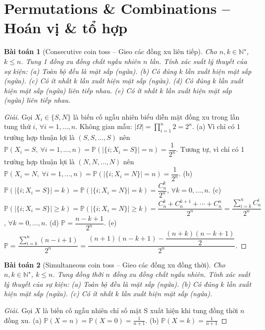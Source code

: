 \documentclass[oneside]{book}
\newtheorem{baitoan}{Bài toán}
\begin{document}

\section{Permutations \& Combinations -- Hoán vị \& tổ hợp}

\begin{baitoan}[Consecutive coin toss -- Gieo các đồng xu liên tiếp]
	Cho $n,k\in\mathbb{N}^\star$, $k\le n$. Tung 1 đồng xu đồng chất ngẫu nhiên $n$ lần. Tính xác suất lý thuyết của sự kiện: (a) Toàn bộ đều là mặt sấp (ngửa). (b) Có đúng $k$ lần xuất hiện mặt sấp (ngửa). (c) Có ít nhất $k$ lần xuất hiện mặt sấp (ngửa). (d) Có đúng $k$ lần xuất hiện mặt sấp (ngửa) liên tiếp nhau. (e) Có ít nhất $k$ lần xuất hiện mặt sấp (ngửa) liên tiếp nhau.
\end{baitoan}

\begin{proof}[Giải]
	Gọi $X_i\in\{S,N\}$ là biến cố ngẫu nhiên biểu diễn mặt đồng xu trong lần tung thứ $i$, $\forall i = 1,\ldots,n$. Không gian mẫu: $|\Omega| = \prod_{i=1}^n 2 = 2^n$. (a) Vì chỉ có 1 trường hợp thuận lợi là $(S,S,\ldots,S)$ nên $\mathbb{P}(X_i = S,\ \forall i = 1,\ldots,n) = \mathbb{P}(|\{i;X_i = S\}| = n) = \dfrac{1}{2^n}$. Tương tự, vì chỉ có 1 trường hợp thuận lợi là $(N,N,\ldots,N)$ nên $\mathbb{P}(X_i = N,\ \forall i = 1,\ldots,n) = \mathbb{P}(|\{i;X_i = N\}| = n) = \dfrac{1}{2^n}$. (b) $\mathbb{P}(|\{i;X_i = S\}| = k) = \mathbb{P}(|\{i;X_i = N\}| = k) = \dfrac{C_n^k}{2^n}$, $\forall k = 0,\ldots,n$. (c) $\mathbb{P}(|\{i;X_i = S\}|\ge k) = \mathbb{P}(|\{i;X_i = N\}|\ge k) = \dfrac{C_n^k + C_n^{k+1} + \cdots + C_n^n}{2^n} = \dfrac{\sum_{i=k}^n C_n^i}{2^n}$, $\forall k = 0,\ldots,n$. (d) $\mathbb{P} = \dfrac{n - k + 1}{2^n}$. (e) $\mathbb{P} = \dfrac{\sum_{i=k}^n (n - i + 1)}{2^n} = \dfrac{(n + 1)(n - k + 1) - \dfrac{(n + k)(n - k + 1)}{2}}{2^n}$.
	
\end{proof}

\begin{baitoan}[Simultaneous coin toss -- Gieo các đồng xu đồng thời]
	Cho $n,k\in\mathbb{N}^\star$, $k\le n$. Tung đồng thời $n$ đồng xu đồng chất ngẫu nhiên. Tính xác suất lý thuyết của sự kiện: (a) Toàn bộ đều là mặt sấp (ngửa). (b) Có đúng $k$ lần xuất hiện mặt sấp (ngửa). (c) Có ít nhất $k$ lần xuất hiện mặt sấp (ngửa).
\end{baitoan}

\begin{proof}[Giải]
	Gọi $X$ là biến cố ngẫu nhiên chỉ số mặt S xuất hiện khi tung đồng thời $n$ đồng xu. (a) $\mathbb{P}(X = n) = \mathbb{P}(X = 0) = \frac{1}{n + 1}$. (b) $\mathbb{P}(X = k) = \frac{1}{n + 1}$
\end{proof}
\end{document}
